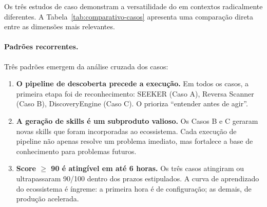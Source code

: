 Os três estudos de caso demonstram a versatilidade do \opencodeeco{}
em contextos radicalmente diferentes. A
Tabela~\ref{tab:comparativo-casos} apresenta uma comparação direta
entre as dimensões mais relevantes.

\begin{table}[htb]
\centering
\caption{Comparativo dos três estudos de caso}
\label{tab:comparativo-casos}
\small
\end{table}

\paragraph{Padrões recorrentes.} Três padrões emergem da análise
cruzada dos casos:

\begin{enumerate}
    \item \textbf{O pipeline de descoberta precede a execução.} Em
          todos os casos, a primeira etapa foi de reconhecimento:
          SEEKER (Caso A), Reversa Scanner (Caso B), DiscoveryEngine
          (Caso C). O \opencodeeco{} prioriza ``entender antes de
          agir''.
    \item \textbf{A geração de skills é um subproduto valioso.} Os
          Casos B e C geraram novas skills que foram incorporadas ao
          ecossistema. Cada execução de pipeline não apenas resolve
          um problema imediato, mas fortalece a base de conhecimento
          para problemas futuros.
    \item \textbf{Score $\ge$ 90 é atingível em até 6 horas.} Os três
          casos atingiram ou ultrapassaram 90/100 dentro dos prazos
          estipulados. A curva de aprendizado do ecossistema é
          íngreme: a primeira hora é de configuração; as demais, de
          produção acelerada.
\end{enumerate}

